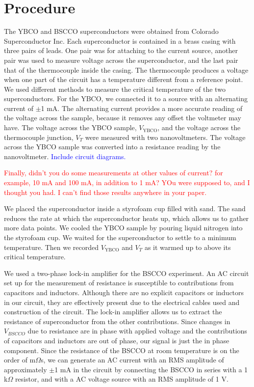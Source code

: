 \documentclass[prb,preprint]{revtex4-1}
\begin{document}
\section{Procedure}
The YBCO and BSCCO superconductors were obtained from Colorado Superconductor Inc. Each superconductor  is contained in a brass casing with three pairs of leads. 
One pair was for attaching to the current source, another pair was used to measure voltage across the superconductor, and the last pair that of the thermocouple inside the casing. 
The thermocouple produces a voltage when one part of the circuit has a temperature different from a reference point.
We used different methods to measure the critical temperature of the two superconductors. 
For the YBCO, we connected it to a source with an alternating current of $\pm$1 mA. The alternating current provides a more accurate reading of the voltage across the sample, because it removes any offset the voltmeter may have.
The voltage across the YBCO sample, $V_{\textrm{YBCO}}$, and the voltage across the thermocouple junction, $V_{T}$ were measured with two nanovoltmeters. 
The voltage across the YBCO sample was converted into a resistance reading by the nanovoltmeter.
 \textcolor{blue}{Include circuit diagrams.} 

\textcolor{red}{Finally, didn't you do some measurements at other values of current? for example, 10 mA and 100 mA, in addition to 1 mA? YOu were supposed to, and I thought you had. I can't find those results anywhere in your paper. } 

We placed the superconductor inside a styrofoam cup filled with sand. 
The sand reduces the rate at which the superconductor heats up, which allows us to gather more data points. 
We cooled the YBCO sample by pouring liquid nitrogen into the styrofoam cup. We waited for the superconductor to settle to a minimum temperature. Then we recorded $V_{\textrm{YBCO}}$ and $V_{T}$ as it warmed up to above its critical temperature. 

We used a two-phase lock-in amplifier for the BSCCO experiment. An AC circuit set up for the measurement of resistance is susceptible to contributions from capacitors and inductors. 
Although there are no explicit capacitors or inductors in our circuit, they are effectively present due to the electrical cables used and construction of the circuit. 
The lock-in amplifier allows us to extract the resistance of superconductor from the other contributions. Since changes in $V_{BSCCO}$ due to resistance are in phase with applied voltage and the contributions of capacitors and inductors are out of phase, our signal is just the in phase component.  
Since the resistance of the BSCCO at room temperature is on the order of m$\Omega$s, we can generate an AC current with an RMS amplitude of approximately $\pm$1 mA in the circuit by connecting the BSCCO in series with a 1 k$\Omega$ resistor, and with a AC voltage source with an RMS amplitude of 1 V. 
\end{document}
